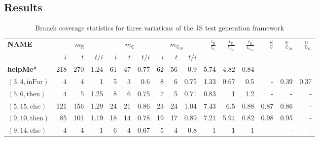 \documentclass[sigconf,review, anonymous]{acmart}
\newcommand{\thenBr}{\text{then}}
\newcommand{\elseBr}{\text{else}}
\newcommand{\inFor}{\text{inFor}}
\newcommand{\Random}{\mathbb{R}}
\newcommand{\Genetic}{\mathbb{G}}
\newcommand{\RGenetic}{\mathbb{G}_{10}}
\begin{document}
\subsection{Results}
\label{sub.sec.eval.results}

\setlength\tabcolsep{.98pt}
\begin{table}[!t]
  \caption{Branch coverage statistics for three variations of the JS test generation framework}
  \label{tbl.stats}
    \scriptsize
    \begin{tabular}{l|rrr|rrr|rrr|rrr|rrr}
      \toprule
      \multirow{2}{*}{\textbf{NAME}} &   \multicolumn{3}{c|}{$m_{\Random}$} & \multicolumn{3}{c|}{$m_{\Genetic}$} & \multicolumn{3}{c|}{$m_{\RGenetic}$} & \multirow{2}{*}{$\frac{t_{\Random}}{t_{\Genetic}}$} &  \multirow{2}{*}{$\frac{t_{\Random}}{t_{\RGenetic}}$} & \multirow{2}{*}{$\frac{t_{\Genetic}}{t_{\RGenetic}}$}   & \multirow{2}{*}{\hfil $_{\Genetic}^{\Random}$} &  \multirow{2}{*}{\hfil $_{\RGenetic}^{\Random}$} & \multirow{2}{*}{\hfil $_{\RGenetic}^{\Genetic}$} \\
      \cline{2-10} %
                             & $i$      & $t$  & $t/i$     & $i$& $t$&$t/i$             &$i$ &$t$ &$t/i$               &      &       &        &      &       &      \\
      \midrule
    \textbf{helpMe}*         & 218      & 270  & 1.24      & 61 & 47 & 0.77             & 62 & 56 & 0.9                & 5.74 & 4.82  & 0.84   &      &      &       \\
    $(3,4,\inFor)$           & 4        & 4    & 1         & 5  & 3  & 0.6              & 8  & 6  & 0.75               & 1.33 & 0.67  & 0.5    & - & 0.39 & 0.37  \\
    $(5,6,\thenBr)$          & 4        & 5    & 1.25      & 8  & 6  & 0.75             & 7  & 5  & 0.71               & 0.83 & 1     & 1.2    & - & -  & -  \\
    $(5,15,\elseBr)$         & 121      & 156  & 1.29      & 24 & 21 & 0.86             & 23 & 24 & 1.04               & 7.43 & 6.5   & 0.88   & 0.87 & 0.86 & -  \\
    $(9,10,\thenBr)$         & 85       & 101  & 1.19      & 18 & 14 & 0.78             & 19 & 17 & 0.89               & 7.21 & 5.94  & 0.82   & 0.98 & 0.95 & -  \\
    $(9,14,\elseBr)$         & 4        & 4    & 1         & 6  & 4  & 0.67             & 5  & 4  & 0.8                & 1    & 1     & 1      & - & - & -  \\
    \hline                                                                                                          

\end{tabular}
\end{table}
\end{document}
